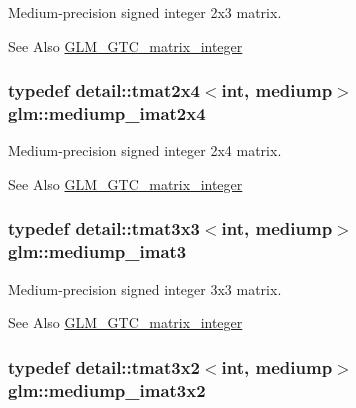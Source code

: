 Medium-\/precision signed integer 2x3 matrix. \begin{DoxySeeAlso}{See Also}
\hyperlink{group__gtc__matrix__integer}{G\-L\-M\-\_\-\-G\-T\-C\-\_\-matrix\-\_\-integer} 
\end{DoxySeeAlso}
\hypertarget{group__gtc__matrix__integer_ga90b020de8489a1d4424c0ffcc17c83dd}{
\subsubsection[{mediump\-\_\-imat2x4}]{\setlength{\rightskip}{0pt plus 5cm}typedef detail\-::tmat2x4$<$int, mediump$>$ {\bf glm\-::mediump\-\_\-imat2x4}}}\label{group__gtc__matrix__integer_ga90b020de8489a1d4424c0ffcc17c83dd}
Medium-\/precision signed integer 2x4 matrix. \begin{DoxySeeAlso}{See Also}
\hyperlink{group__gtc__matrix__integer}{G\-L\-M\-\_\-\-G\-T\-C\-\_\-matrix\-\_\-integer} 
\end{DoxySeeAlso}
\hypertarget{group__gtc__matrix__integer_ga6b438ab863af0122b532adc93b89105e}{
\subsubsection[{mediump\-\_\-imat3}]{\setlength{\rightskip}{0pt plus 5cm}typedef detail\-::tmat3x3$<$int, mediump$>$ {\bf glm\-::mediump\-\_\-imat3}}}\label{group__gtc__matrix__integer_ga6b438ab863af0122b532adc93b89105e}
Medium-\/precision signed integer 3x3 matrix. \begin{DoxySeeAlso}{See Also}
\hyperlink{group__gtc__matrix__integer}{G\-L\-M\-\_\-\-G\-T\-C\-\_\-matrix\-\_\-integer} 
\end{DoxySeeAlso}
\hypertarget{group__gtc__matrix__integer_ga2a90775c74656b8a825f24d510f0ea5d}{
\subsubsection[{mediump\-\_\-imat3x2}]{\setlength{\rightskip}{0pt plus 5cm}typedef detail\-::tmat3x2$<$int, mediump$>$ {\bf glm\-::mediump\-\_\-imat3x2}}}\label{group__gtc__matrix__integer_ga2a90775c74656b8a825f24d510f0ea5d}
